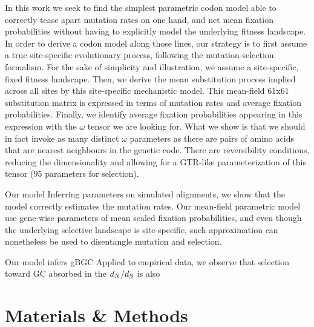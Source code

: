 In this work we seek to find the simplest parametric codon model able to correctly tease apart mutation rates on one hand, and net mean fixation probabilities without having to explicitly model the underlying fitness landscape.
In order to derive a codon model along those lines, our strategy is to first assume a true site-specific evolutionary process, following the mutation-selection formalism.
For the sake of simplicity and illustration, we assume a site-specific, fixed fitness landscape.
Then, we derive the mean substitution process implied across all sites by this site-specific mechanistic model.
This mean-field $61$x$61$ substitution matrix is expressed in terms of mutation rates and average fixation probabilities.
Finally, we identify average fixation probabilities appearing in this expression with the $\omega$ tensor we are looking for.
What we show is that we should in fact invoke as many distinct $\omega$ parameters as there are pairs of amino acids that are nearest neighbours in the genetic code.
There are reversibility conditions, reducing the dimensionality and allowing for a GTR-like parameterization of this tensor ($95$ parameters for selection).

Our model
Inferring parameters on simulated alignments, we show that the model correctly estimates the mutation rates.
Our mean-field parametric model use gene-wise parameters of mean scaled fixation probabilities, and even though the underlying selective landscape is site-specific, such approximation can nonetheless be used to disentangle mutation and selection.

Our model infers gBGC
Applied to empirical data, we observe that selection toward GC absorbed in the $d_N / d_S$ is also

\section{Materials \& Methods}

